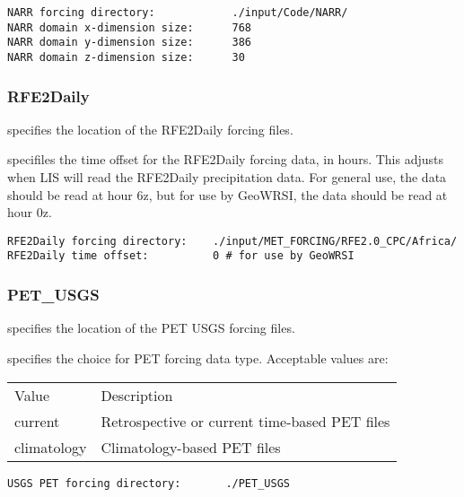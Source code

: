  \begin{Verbatim}[frame=single]
NARR forcing directory:            ./input/Code/NARR/
NARR domain x-dimension size:      768
NARR domain y-dimension size:      386
NARR domain z-dimension size:      30
 \end{Verbatim}



 
 \subsubsection{RFE2Daily} \label{sssec:supp_rfe2daily}
 

 
  specifies the location of the
 RFE2Daily forcing files.

  specifiles the time offset for the
 RFE2Daily forcing data, in hours.  This adjusts when LIS will
 read the RFE2Daily precipitation data.  For general use, the data
 should be read at hour 6z, but for use by GeoWRSI, the data should be
 read at hour 0z.
 

 \begin{Verbatim}[frame=single]
RFE2Daily forcing directory:    ./input/MET_FORCING/RFE2.0_CPC/Africa/
RFE2Daily time offset:          0 # for use by GeoWRSI
 \end{Verbatim}



 
 \subsubsection{PET\_USGS} \label{sssec:supp_petusgs}
 

 
  specifies the location of the
 PET USGS forcing files.

  specifies the choice for PET forcing
  data type.
 Acceptable values are:

 \begin{tabular}{ll}
 Value & Description    \\
  current       & Retrospective or current time-based PET files  \\
  climatology   & Climatology-based PET files  \\
 \end{tabular}
 

 \begin{Verbatim}[frame=single]
USGS PET forcing directory:       ./PET_USGS
 \end{Verbatim}

